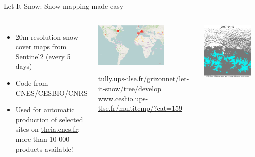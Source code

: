 \begin{frame}{Let It Snow: Snow mapping made easy}

  \begin{columns}
  \begin{itemize}
    \item 20m resolution snow cover maps from Sentinel2 (every 5 days)
    \item Code from CNES/CESBIO/CNRS
    \item Used for automatic production of selected sites on \url{theia.cnes.fr}: more than 10 000 products available!
  \end{itemize}
  \begin{center}
    \includegraphics[width=0.7\textwidth]{images/lis-map.png}\\
    \begin{tiny}
      \url{tully.ups-tlse.fr/grizonnet/let-it-snow/tree/develop}\\
      \url{www.cesbio.ups-tlse.fr/multitemp/?cat=159}
    \end{tiny}
  \end{center}
  \begin{center}
    \includegraphics[width=0.92\textwidth]{images/lis-example.png}\\

\end{center}
\end{columns}
\end{frame}
